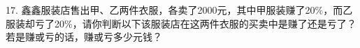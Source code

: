 17.	鑫鑫服装店售出甲、乙两件衣服，各卖了2000元，其中甲服装赚了20$\%$，而乙服装却亏了20$\%$，请你判断以下该服装店在这两件衣服的买卖中是赚了还是亏了？若是赚或亏的话，赚或亏多少元钱？



